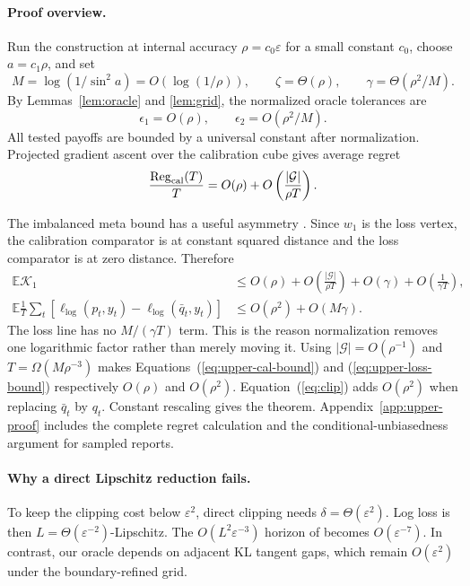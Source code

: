 \documentclass{article}
\newcommand{\calK}{\mathcal{K}}
\begin{document}
\paragraph{Proof overview.}
Run the construction at internal accuracy $\rho=c_0\varepsilon$ for a small constant $c_0$, choose $a=c_1\rho$, and set
\begin{equation}
 M=\log(1/\sin^2a)=O(\log(1/\rho)),\qquad
 \zeta=\Theta(\rho),\qquad
 \gamma=\Theta(\rho^2/M).
 \label{eq:steps}
\end{equation}
By Lemmas~\ref{lem:oracle} and \ref{lem:grid}, the normalized oracle tolerances are
\begin{equation}
 \epsilon_1=O(\rho),\qquad
 \epsilon_2=O(\rho^2/M).
 \label{eq:tolerances}
\end{equation}
All tested payoffs are bounded by a universal constant after normalization. Projected gradient ascent over the calibration cube gives average regret
\begin{equation}
 \frac{\operatorname{Reg}_{\rm cal}(T)}T
 =O(\rho)+O\left(\frac{|\mathcal G|}{\rho T}\right).
 \label{eq:cal-regret}
\end{equation}

The imbalanced meta bound has a useful asymmetry \citep{hu2026optimal}. Since $w_1$ is the loss vertex, the calibration comparator is at constant squared distance and the loss comparator is at zero distance. Therefore
\begin{align}
 \mathbb{E}\calK_1
 &\leq O(\rho)
 +O\left(\frac{|\mathcal G|}{\rho T}\right)
 +O(\gamma)+O\left(\frac1{\gamma T}\right),
 \label{eq:upper-cal-bound}\\
 \mathbb{E}\frac1T\sum_t
 [\ell_{\log}(p_t,y_t)-\ell_{\log}(\bar q_t,y_t)]
 &\leq O(\rho^2)+O(M\gamma).
 \label{eq:upper-loss-bound}
\end{align}
The loss line has no $M/(\gamma T)$ term. This is the reason normalization removes one logarithmic factor rather than merely moving it. Using $|\mathcal G|=O(\rho^{-1})$ and $T=\Omega(M\rho^{-3})$ makes Equations~(\ref{eq:upper-cal-bound}) and (\ref{eq:upper-loss-bound}) respectively $O(\rho)$ and $O(\rho^2)$. Equation~(\ref{eq:clip}) adds $O(\rho^2)$ when replacing $\bar q_t$ by $q_t$. Constant rescaling gives the theorem. Appendix~\ref{app:upper-proof} includes the complete regret calculation and the conditional-unbiasedness argument for sampled reports.

\paragraph{Why a direct Lipschitz reduction fails.}
To keep the clipping cost below $\varepsilon^2$, direct clipping needs $\delta=\Theta(\varepsilon^2)$. Log loss is then $L=\Theta(\varepsilon^{-2})$-Lipschitz. The $O(L^2\varepsilon^{-3})$ horizon of \citet{hu2026optimal} becomes $O(\varepsilon^{-7})$. In contrast, our oracle depends on adjacent KL tangent gaps, which remain $O(\varepsilon^2)$ under the boundary-refined grid.
\end{document}
